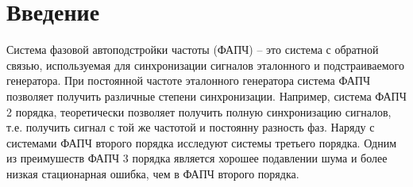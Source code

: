\documentclass[a4paper,14pt]{extarticle} %
\begin{document}
\section{Введение}
Система фазовой автоподстройки частоты (ФАПЧ) -- это система с обратной связью, используемая для синхронизации сигналов эталонного и подстраиваемого генератора. При постоянной частоте эталонного генератора система ФАПЧ позволяет получить различные степени синхронизации. Например, система ФАПЧ 2 порядка, теоретически позволяет получить полную синхронизацию сигналов, т.е. получить сигнал с той же частотой и постоянну разность фаз. Наряду с системами ФАПЧ второго порядка исследуют системы третьего порядка. Одним из преимушеств ФАПЧ 3 порядка является хорошее подавлении шума и более низкая стационарная ошибка, чем в ФАПЧ второго порядка.
\\\\

\newpage
\end{document}
